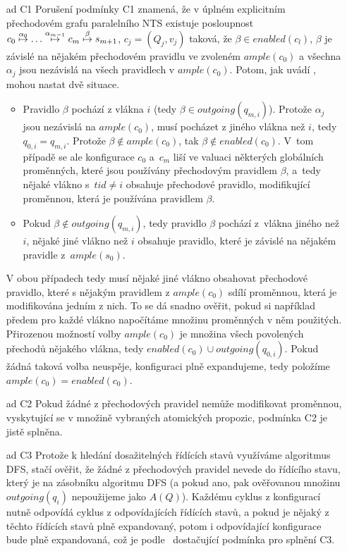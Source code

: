 \documentclass[12pt]{fithesis2}
\begin{document}
\begin{enumerate}
\item[ad C1] Porušení podmínky C1 \label{subsec:c1-violation} znamená, že v úplném explicitním přechodovém grafu paralelního NTS existuje posloupnost $c_0 \overset{\alpha_0}{\mapsto} \ldots \overset{\alpha_{m-1}}{\mapsto} c_m \overset{\beta}{\mapsto} s_{m+1}$, $c_j = (Q_j, v_j)$ taková, že $\beta \in \mathit{enabled}(c_l)$, $\beta$ je závislé na nějakém přechodovém pravidlu ve zvoleném $\mathit{ample}(c_0)$ a všechna $\alpha_j$ jsou nezávislá na všech pravidlech v $\mathit{ample}(c_0)$. Potom, jak uvádí \cite{CLARKE}, mohou nastat dvě situace.

	\begin{itemize}
		\item Pravidlo $\beta$ pochází z vlákna $i$ (tedy $\beta \in \mathit{outgoing}(q_{m,i})$).  Protože $\alpha_j$ jsou nezávislá na $\mathit{ample}(c_0)$, musí pocházet z jiného vlákna než $i$, tedy $q_{0,i} = q_{m,i}$. Protože $\beta \not \in \mathit{ample}(c_0)$, tak $\beta \not \in \mathit{enabled}(c_0)$. V~tom případě se ale konfigurace $c_0$ a~$c_m$ liší ve valuaci některých globálních proměnných, které jsou používány přechodovým pravidlem $\beta$, a~tedy nějaké vlákno s~$tid \neq i$ obsahuje přechodové pravidlo, modifikující proměnnou, která je používána pravidlem $\beta$.

		\item Pokud $\beta \not \in \mathit{outgoing}(q_{m,i})$, tedy pravidlo $\beta$ pochází z~vlákna jiného než $i$, nějaké jiné vlákno než $i$ obsahuje pravidlo, které je závislé na nějakém pravidle z~$\mathit{ample}(s_0)$.
	\end{itemize}

	V obou případech tedy musí nějaké jiné vlákno obsahovat přechodové pravidlo, které s nějakým pravidlem z $\mathit{ample}(c_0)$ sdílí proměnnou, která je modifikována jedním z nich. To se dá snadno ověřit, pokud si například předem pro každé vlákno napočítáme množinu proměnných v něm použitých. Přirozenou možností volby $\mathit{ample}(c_0)$ je množina všech povolených přechodů nějakého vlákna, tedy $\mathit{enabled}(c_0) \cup \mathit{outgoing}(q_{0, i})$. Pokud žádná taková volba neuspěje, konfiguraci plně expandujeme, tedy položíme $\mathit{ample}(c_0) = \mathit{enabled}(c_0)$.

\item[ad C2] Pokud žádné z přechodových pravidel nemůže modifikovat proměnnou, vyskytující se v množině vybraných atomických propozic, podmínka C2 je jistě splněna.

\item[ad C3] Protože k hledání dosažitelných řídících stavů využíváme algoritmus DFS, stačí ověřit, že žádné z přechodových pravidel nevede do řídícího stavu, který je na zásobníku algoritmu DFS (a pokud ano, pak ověřovanou množinu $\mathit{outgoing}(q_i)$ nepoužijeme jako $A(Q)$). Každému cyklus z konfigurací nutně odpovídá cyklus z odpovídajících řídících stavů, a pokud je nějaký z těchto řídících stavů plně expandovaný, potom i odpovídající konfigurace bude plně expandovaná, což je podle~\cite{CLARKE} dostačující podmínka pro splnění C3.

\end{enumerate}
\end{document}
